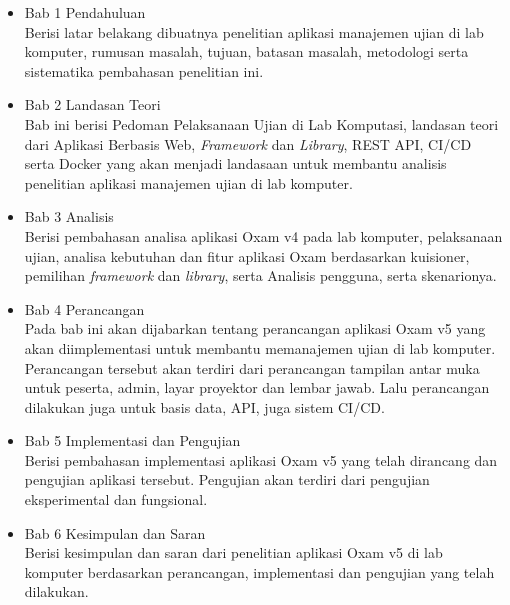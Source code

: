 \begin{itemize}
    \item Bab 1 Pendahuluan \\
        Berisi latar belakang dibuatnya penelitian aplikasi manajemen ujian di lab komputer, 
        rumusan masalah, tujuan, batasan masalah, metodologi serta sistematika pembahasan penelitian ini.
    
    \item Bab 2 Landasan Teori \\
        Bab ini berisi Pedoman Pelaksanaan Ujian di Lab Komputasi, landasan
        teori dari Aplikasi Berbasis Web, \textit{Framework} dan
        \textit{Library}, REST API, CI/CD serta Docker yang akan menjadi
        landasaan untuk membantu analisis penelitian aplikasi manajemen ujian di
        lab komputer.
        
    \item Bab 3 Analisis \\
        Berisi pembahasan analisa aplikasi Oxam v4 pada lab komputer,
        pelaksanaan ujian, analisa kebutuhan dan fitur aplikasi Oxam berdasarkan
        kuisioner, pemilihan \textit{framework} dan \textit{library}, serta
        Analisis pengguna, serta skenarionya.
        
    \item Bab 4 Perancangan \\
        Pada bab ini akan dijabarkan tentang perancangan aplikasi Oxam v5 yang akan
        diimplementasi untuk membantu memanajemen ujian di lab komputer.
        Perancangan tersebut akan terdiri dari perancangan tampilan antar muka
        untuk peserta, admin, layar proyektor dan lembar jawab. Lalu perancangan
        dilakukan juga untuk basis data, API, juga sistem CI/CD.
    
    \item Bab 5 Implementasi dan Pengujian \\
        Berisi pembahasan implementasi aplikasi Oxam v5 yang telah dirancang dan
        pengujian aplikasi tersebut. Pengujian akan terdiri dari pengujian
        eksperimental dan fungsional.
        
    \item Bab 6 Kesimpulan dan Saran \\
        Berisi kesimpulan dan saran dari penelitian aplikasi Oxam v5 di
        lab komputer berdasarkan perancangan, implementasi dan pengujian yang
        telah dilakukan.
\end{itemize}